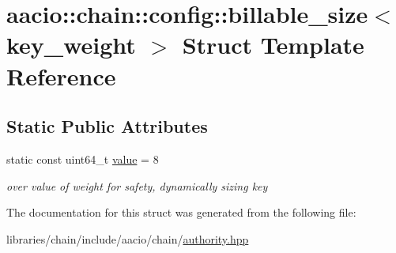 \hypertarget{structaacio_1_1chain_1_1config_1_1billable__size_3_01key__weight_01_4}{}\section{aacio\+:\+:chain\+:\+:config\+:\+:billable\+\_\+size$<$ key\+\_\+weight $>$ Struct Template Reference}
\label{structaacio_1_1chain_1_1config_1_1billable__size_3_01key__weight_01_4}
\subsection*{Static Public Attributes}
\begin{DoxyCompactItemize}
\item 
\mbox{\label{structaacio_1_1chain_1_1config_1_1billable__size_3_01key__weight_01_4_ac73861dd95da9d9613cf45de9670de3d}} 
static const uint64\+\_\+t \mbox{\hyperlink{structaacio_1_1chain_1_1config_1_1billable__size_3_01key__weight_01_4_ac73861dd95da9d9613cf45de9670de3d}{value}} = 8
\begin{DoxyCompactList}\small\item\em over value of weight for safety, dynamically sizing key \end{DoxyCompactList}\end{DoxyCompactItemize}


The documentation for this struct was generated from the following file\+:\begin{DoxyCompactItemize}
\item 
libraries/chain/include/aacio/chain/\mbox{\hyperlink{authority_8hpp}{authority.\+hpp}}\end{DoxyCompactItemize}
